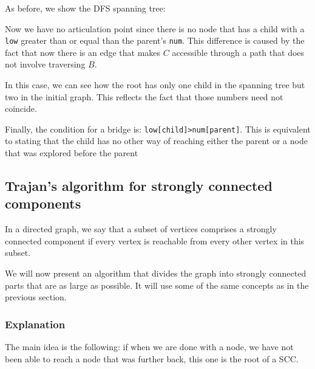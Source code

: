 As before, we show the DFS spanning tree:
\begin{figure}[h!]
\centering
{}
\end{figure}

Now we have no articulation point since there is no node that has a child
with a \texttt{low} greater than or equal  than the parent's \texttt{num}. 
This difference is caused by the fact that now there is an edge that makes $C$
accessible through a path that does not involve traversing $B$.

In this case, we can see how the root has only one child in the spanning tree
but two in the initial graph. This reflects the fact that those numbers need not
coincide.

Finally, the condition for a bridge is: \texttt{low[child]>num[parent]}. This is 
equivalent to  stating that the child has no other way of reaching either the
parent or a node that was explored before the parent

\subsection{Trajan's algorithm for strongly connected components}
In a directed graph, we say that a subset of vertices comprises a strongly 
connected component if every vertex is reachable from every other vertex in
this subset.

We will now present an algorithm that divides the graph into strongly
connected parts that are as large as possible. It will use some of the 
same concepts as in the previous section. 
\subsubsection*{Explanation}
The main idea is the following: if when we are done with a node, we have not been
able to reach a node that was further back, this one is the root of a SCC. 

